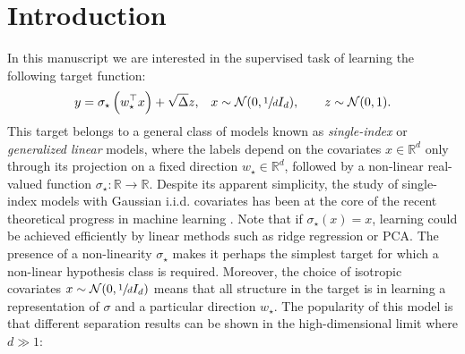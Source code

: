 \section{Introduction}

\label{2305:sec:intro}
In this manuscript we are interested in the supervised task of learning the following target function:
\begin{align}
\label{2305:eq:def:teacher}
    y = \sigma_{\star}\left(w_{\star}^{\top}x\right) + \sqrt{\Delta}z, && x\sim\mathcal{N}(0,\sfrac{1}{d} I_{d}), \qquad z\sim\mathcal{N}(0,1).
\end{align}
This target belongs to a general class of models known as \emph{single-index} or \emph{generalized linear} models, where the labels depend on the covariates $x\in\mathbb{R}^{d}$ only through its projection on a fixed direction $w_{\star}\in\mathbb{R}^{d}$, followed by a non-linear real-valued function $\sigma_{\star}:\mathbb{R}\to\mathbb{R}$. Despite its apparent simplicity, the study of single-index models with Gaussian i.i.d. covariates has been at the core of the recent theoretical progress in machine learning \citep{tan2019online,arous2021online,bietti2022learning,damian2022neural,berthier2023learning}. Note that if $\sigma_{\star}(x)=x$, learning could be achieved efficiently by linear methods such as ridge regression or PCA. The presence of a non-linearity $\sigma_{\star}$ makes it perhaps the simplest target for which a non-linear hypothesis class is required. Moreover, the choice of isotropic covariates $x\sim\mathcal{N}(0,\sfrac{1}{d}I_{d})$ means that all structure in the target is in learning a representation of $\sigma$ and a particular direction $w_{\star}$. The popularity of this model is that different separation results can be shown in the high-dimensional limit where $d\gg 1$:
